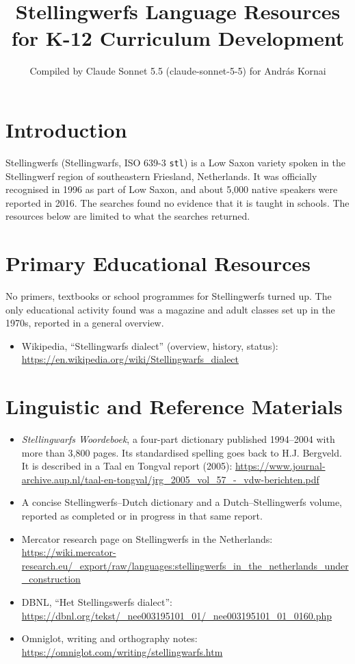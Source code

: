 \documentclass[12pt]{article}
\title{Stellingwerfs Language Resources for K-12 Curriculum Development}
\author{Compiled by Claude Sonnet 5.5 (claude-sonnet-5-5) for Andr\'as Kornai}
\date{}
\begin{document}
\maketitle

\section{Introduction}
Stellingwerfs (Stellingwarfs, ISO 639-3 \texttt{stl}) is a Low Saxon variety spoken in the Stellingwerf region of southeastern Friesland, Netherlands. It was officially recognised in 1996 as part of Low Saxon, and about 5,000 native speakers were reported in 2016. The searches found no evidence that it is taught in schools. The resources below are limited to what the searches returned.

\section{Primary Educational Resources}
No primers, textbooks or school programmes for Stellingwerfs turned up. The only educational activity found was a magazine and adult classes set up in the 1970s, reported in a general overview.
\begin{itemize}
\item Wikipedia, ``Stellingwarfs dialect'' (overview, history, status): \url{https://en.wikipedia.org/wiki/Stellingwarfs_dialect}
\end{itemize}

\section{Linguistic and Reference Materials}
\begin{itemize}
\item \emph{Stellingwarfs Woordeboek}, a four-part dictionary published 1994--2004 with more than 3,800 pages. Its standardised spelling goes back to H.J. Bergveld. It is described in a Taal en Tongval report (2005): \url{https://www.journal-archive.aup.nl/taal-en-tongval/jrg_2005_vol_57_-_vdw-berichten.pdf}
\item A concise Stellingwerfs--Dutch dictionary and a Dutch--Stellingwerfs volume, reported as completed or in progress in that same report.
\item Mercator research page on Stellingwerfs in the Netherlands: \url{https://wiki.mercator-research.eu/_export/raw/languages:stellingwerfs_in_the_netherlands_under_construction}
\item DBNL, ``Het Stellingswerfs dialect'': \url{https://dbnl.org/tekst/_nee003195101_01/_nee003195101_01_0160.php}
\item Omniglot, writing and orthography notes: \url{https://omniglot.com/writing/stellingwarfs.htm}
\end{itemize}
\end{document}

